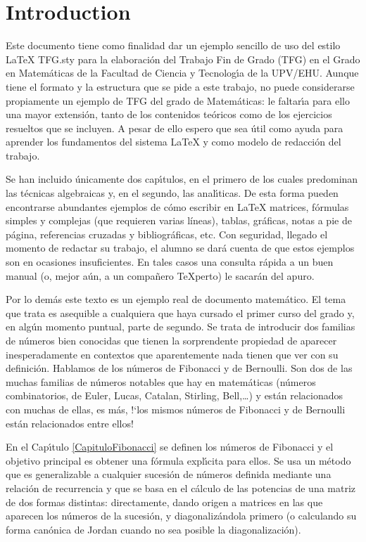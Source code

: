 \chapter{Introduction}

Este documento tiene como  finalidad dar un ejemplo sencillo de uso del estilo LaTeX TFG.sty para la elaboraci\'on del Trabajo Fin de Grado (TFG) en el Grado en Matem\'aticas de la Facultad de Ciencia y Tecnolog\'\i a de la UPV/EHU. Aunque tiene el formato y la estructura que se pide a este trabajo, no puede considerarse propiamente un ejemplo de TFG del grado de Matem\'aticas: le faltar\'\i a para ello una mayor extensi\'on, tanto de los contenidos te\'oricos como de los ejercicios resueltos que se incluyen. A pesar de ello espero que sea \'util  como ayuda para aprender los fundamentos del sistema LaTeX y como modelo de redacci\'on del trabajo.

Se han incluido \'unicamente dos cap\'\i tulos, en el primero de los cuales predominan las t\'ecnicas algebraicas y, en el segundo, las anal\'\i ticas. De esta forma pueden encontrarse abundantes ejemplos de c\'omo escribir en LaTeX matrices, f\'ormulas simples y complejas (que requieren varias l\'ineas), tablas,  gr\'aficas, notas a pie de p\'agina, referencias cruzadas y bibliogr\'aficas, etc. Con seguridad, llegado el momento de redactar su trabajo, el alumno se dar\'a cuenta de que estos ejemplos son  en ocasiones insuficientes.  En tales casos una consulta r\'apida a un buen manual (o, mejor a\'un, a un compa\~nero TeXperto) le sacar\'an del apuro.

Por lo dem\'as este texto es un ejemplo real de documento matem\'atico. El tema que trata es asequible a cualquiera que haya cursado el primer curso del grado y, en alg\'un momento puntual, parte de segundo. Se trata de introducir dos familias de n\'umeros bien conocidas que tienen la sorprendente propiedad de aparecer inesperadamente en contextos que aparentemente   nada tienen que ver con su definici\'on. Hablamos de los n\'umeros de Fibonacci y de Bernoulli. Son dos de las muchas familias de n\'umeros notables que hay en matem\'aticas (n\'umeros combinatorios, de Euler, Lucas, Catalan, Stirling, Bell,\ldots) y est\'an relacionados con muchas de ellas, es m\'as, !`los mismos n\'umeros de Fibonacci y de Bernoulli est\'an relacionados entre ellos!

En el Cap\'\i tulo \ref{CapituloFibonacci} se definen los n\'umeros de Fibonacci y el objetivo principal es obtener una f\'ormula expl\'\i cita para ellos. Se usa un m\'etodo que es generalizable a cualquier sucesi\'on de n\'umeros definida mediante una relaci\'on de recurrencia y que se basa en el c\'alculo de las potencias de una matriz de dos formas distintas: directamente, dando origen a matrices en las que aparecen los n\'umeros de la sucesi\'on, y diagonaliz\'andola primero (o calculando su forma can\'onica de Jordan cuando no sea posible la diagonalizaci\'on).

